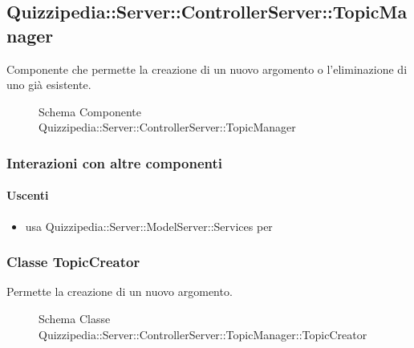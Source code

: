 \subsection{Quizzipedia::Server::ControllerServer::TopicManager}
Componente che permette la creazione di un nuovo argomento o l'eliminazione di uno già esistente.
\begin{figure}[H]
\centering
\noindent{}
\caption[Schema Componente Quizzipedia::Server::ControllerServer::TopicManager]{Schema Componente Quizzipedia::Server::ControllerServer::TopicManager}
\end{figure}
\subsubsection{Interazioni con altre componenti}
\paragraph{Uscenti}
\begin{itemize}
\item usa Quizzipedia::Server::ModelServer::Services per 
\end{itemize}
\subsubsection{Classe TopicCreator}
Permette la creazione di un nuovo argomento.
\begin{figure}[H]
\centering
\noindent{}
\caption[Schema Classe TopicCreator]{Schema Classe Quizzipedia::Server::ControllerServer::TopicManager::TopicCreator}
\end{figure}
